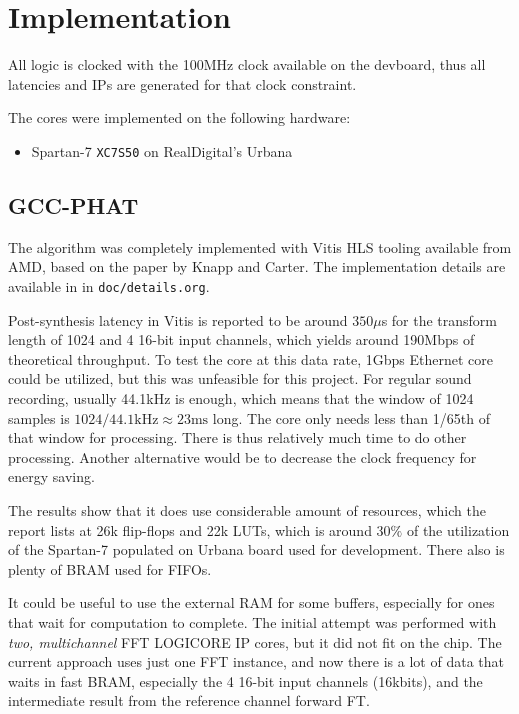 \documentclass[a4paper,twocolumn]{article}
\begin{document}
\section{Implementation}

All logic is clocked with the 100MHz clock available on the devboard,
thus all latencies and IPs are generated for that clock
constraint.

The cores were implemented on the following hardware:
\begin{itemize}
\item Spartan-7 \texttt{XC7S50} on RealDigital's Urbana\cite{urbana}
\end{itemize}

\subsection{GCC-PHAT}

The algorithm was completely implemented with Vitis HLS tooling
available from AMD, based on the paper by Knapp and
Carter\cite{gccphat}. The implementation details are available in in
\texttt{doc/details.org}.

Post-synthesis latency in Vitis is reported to be around $350\mu$s for
the transform length of 1024 and 4 16-bit input channels, which yields
around 190Mbps of theoretical throughput. To test the core at this
data rate, 1Gbps Ethernet core could be utilized, but this was
unfeasible for this project. For regular sound recording, usually
44.1kHz is enough, which means that the window of 1024 samples is
$1024 / 44.1\mathrm{kHz} \approx 23\mathrm{ms}$ long. The core only
needs less than 1/65th of that window for processing. There is thus
relatively much time to do other processing. Another alternative would
be to decrease the clock frequency for energy saving.

The results show that it does use considerable amount of resources,
which the report lists at 26k flip-flops and 22k LUTs, which is around
$30\%$ of the utilization of the Spartan-7 populated on Urbana board
used for development. There also is plenty of BRAM used for FIFOs.

It could be useful to use the external RAM for some buffers,
especially for ones that wait for computation to complete. The initial
attempt was performed with \emph{two, multichannel} FFT LOGICORE IP
cores, but it did not fit on the chip. The current approach uses just
one FFT instance, and now there is a lot of data that waits in fast
BRAM, especially the 4 16-bit input channels (16kbits), and the intermediate
result from the reference channel forward FT.
\end{document}
